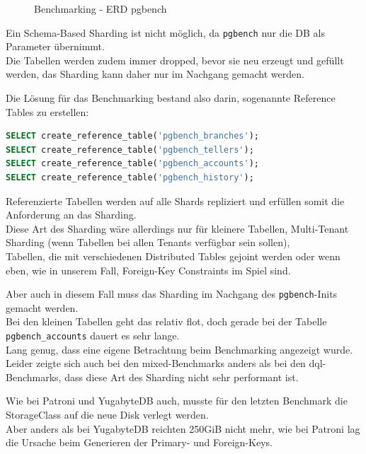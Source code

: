 \begin{flushleft}
\begin{figure}[H]
        \caption{Benchmarking - ERD pgbench}
        \label{fig:pgbench_accounts}
    \end{figure}
    Ein Schema-Based Sharding ist nicht möglich, da \texttt{pgbench} nur die DB als Parameter übernimmt.\\
    Die Tabellen werden zudem immer dropped, bevor sie neu erzeugt und gefüllt werden, das Sharding kann daher nur im Nachgang gemacht werden.\\
\end{flushleft}
\begin{flushleft}
    Die Lösung für das Benchmarking bestand also darin, sogenannte Reference Tables zu erstellen:
\lstset{style=gra_codestyle}
\begin{lstlisting}[language=sql, caption=Citus - Benchmarking - Reference Table Sharding,captionpos=b,label={lst:benchmarking_reference_table_sharding},breaklines=true]
SELECT create_reference_table('pgbench_branches');
SELECT create_reference_table('pgbench_tellers');
SELECT create_reference_table('pgbench_accounts');
SELECT create_reference_table('pgbench_history');
\end{lstlisting}
    Referenzierte Tabellen werden auf alle Shards repliziert und erfüllen somit die Anforderung an das Sharding.\\
    Diese Art des Sharding wäre allerdings nur für kleinere Tabellen, Multi-Tenant Sharding (wenn Tabellen bei allen Tenants verfügbar sein sollen),\\
    Tabellen, die mit verschiedenen Distributed Tables gejoint werden oder wenn eben, wie in unserem Fall, Foreign-Key Constraints im Spiel sind\cite{KPPLMKD4}.
\end{flushleft}
\begin{flushleft}
    Aber auch in diesem Fall muss das Sharding im Nachgang des \texttt{pgbench}-Inits gemacht werden.\\
    Bei den kleinen Tabellen geht das relativ flot, doch gerade bei der Tabelle \texttt{pgbench\_accounts} dauert es sehr lange.\\
    Lang genug, dass eine eigene Betrachtung beim Benchmarking angezeigt wurde.\\
    Leider zeigte sich auch bei den mixed-Benchmarks anders als bei den dql-Benchmarks, dass diese Art des Sharding nicht sehr performant ist.
\end{flushleft}
\begin{flushleft}
    Wie bei Patroni und YugabyteDB auch, musste für den letzten Benchmark die StorageClass auf die neue Disk verlegt werden.\\
    Aber anders als bei YugabyteDB reichten 250GiB nicht mehr, wie bei Patroni lag die Ursache beim Generieren der Primary- und Foreign-Keys.
\end{flushleft}
